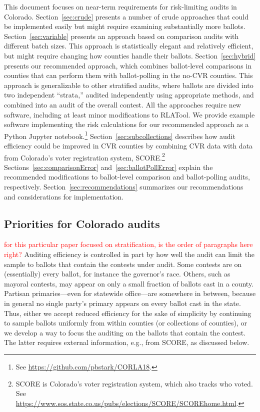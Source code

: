 \documentclass[12pt]{article}
\newcommand{\note}[1]{\textcolor{red}{\sc #1}}
\begin{document}
This document focuses on near-term requirements for risk-limiting audits in Colorado.
Section~\ref{sec:crude} presents a number of crude approaches
that could be implemented easily
but might require examining substantially more ballots.
Section~\ref{sec:variable}
presents an approach based on comparison audits with different batch sizes.
This approach is statistically elegant and relatively efficient, but might require changing how counties
handle their ballots.
Section~\ref{sec:hybrid} presents our recommended approach, which combines ballot-level
comparisons in counties that can perform them with ballot-polling in the no-CVR counties.
This approach is generalizable to other stratified audits, where ballots are divided into two independent
``strata,'' audited independently using appropriate methods, and combined into an audit of the
overall contest.
All the approaches require new software, including at least minor modifications to RLATool.
We provide example software implementing the risk calculations for
our recommended approach as a Python Jupyter notebook.\footnote{%
 See \url{https://github.com/pbstark/CORLA18}.
}
Section~\ref{sec:subcollections}
describes how audit efficiency could be improved in CVR counties by combining CVR
data with data from Colorado's voter registration system, SCORE.\footnote{%
  SCORE is Colorado's voter registration system, which also tracks who voted.
  See \url{https://www.sos.state.co.us/pubs/elections/SCORE/SCOREhome.html}.
} 
Sections~\ref{sec:comparisonError} and~\ref{sec:ballotPollError} explain the recommended
modifications to ballot-level comparison and ballot-polling audits, respectively. 
Section~\ref{sec:recommendations} summarizes our recommendations and
considerations for implementation.

\subsection{Priorities for Colorado audits}
\note{for this particular paper focused on stratification, is the order of paragraphs here right?}
Auditing efficiency is controlled in part by how well the audit can limit the sample to ballots that
contain the contests under audit.
Some contests are on (essentially) every ballot, for instance the governor's race.
Others, such as mayoral contests, may appear on only a small fraction of ballots cast in
a county.
Partisan primaries---even for statewide office---are somewhere in between,
because in general no single party's primary appears on every ballot cast in the state.
Thus, either we accept reduced %
efficiency for the sake of simplicity by continuing to sample ballots uniformly from within 
counties (or collections of counties), or we develop a way to
focus the auditing on the ballots that contain the contest.
The latter requires external information, e.g., from SCORE,
as discussed below.
\end{document}
